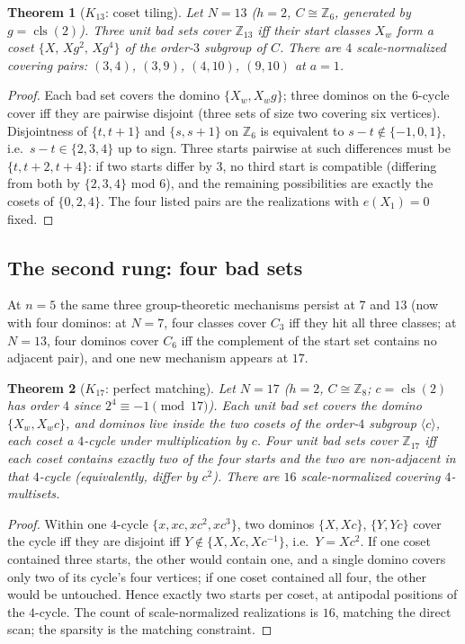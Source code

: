 \documentclass[11pt,a4paper]{article}
\numberwithin{equation}{section}
\theoremstyle{plain}
\theoremstyle{plain}
\newtheorem{theorem}{Theorem}[section]
\theoremstyle{definition}
\theoremstyle{remark}
\newcommand{\Z}{\mathbb{Z}}
\DeclareMathOperator{\cls}{cls}
\begin{document}
\begin{theorem}[$K_{13}$: coset tiling]\label{thm:K13}
Let $N=13$ ($h=2$, $C\cong\Z_6$, generated by $g=\cls(2)$). Three unit
bad sets cover $\Z_{13}$ iff their start classes $X_w$ form a coset
$\{X,\,Xg^2,\,Xg^4\}$ of the order-$3$ subgroup of $C$. There are $4$
scale-normalized covering pairs: $(3,4)$, $(3,9)$, $(4,10)$, $(9,10)$ at
$a=1$.
\end{theorem}

\begin{proof}
Each bad set covers the domino $\{X_w,X_wg\}$; three dominos on the
$6$-cycle cover iff they are pairwise disjoint (three sets of size two
covering six vertices). Disjointness of $\{t,t+1\}$ and $\{s,s+1\}$ on
$\Z_6$ is equivalent to $s-t\notin\{-1,0,1\}$, i.e.\ $s-t\in\{2,3,4\}$
up to sign. Three starts pairwise at such differences must be
$\{t,t+2,t+4\}$: if two starts differ by $3$, no third start is compatible
(differing from both by $\{2,3,4\}$ mod $6$), and the remaining
possibilities are exactly the cosets of $\{0,2,4\}$. The four listed
pairs are the realizations with $e(X_1)=0$ fixed.
\end{proof}

\subsection{The second rung: four bad sets}\label{sec:K5}

At $n=5$ the same three group-theoretic mechanisms persist at
$7$ and $13$ (now with four dominos: at $N=7$, four classes cover
$C_3$ iff they hit all three classes; at $N=13$, four dominos cover
$C_6$ iff the complement of the start set contains no adjacent pair), and
one new mechanism appears at $17$.

\begin{theorem}[$K_{17}$: perfect matching]\label{thm:K17}
Let $N=17$ ($h=2$, $C\cong\Z_8$; $c=\cls(2)$ has order $4$ since
$2^4\equiv-1 \pmod{17}$). Each unit bad set covers the domino
$\{X_w,X_wc\}$, and dominos live inside the two cosets of the order-$4$
subgroup $\langle c\rangle$, each coset a $4$-cycle under multiplication
by $c$. Four unit bad sets cover $\Z_{17}$ iff each coset contains
exactly two of the four starts and the two are non-adjacent in that
$4$-cycle (equivalently, differ by $c^2$). There are $16$
scale-normalized covering $4$-multisets.
\end{theorem}

\begin{proof}
Within one $4$-cycle $\{x,xc,xc^2,xc^3\}$, two dominos
$\{X,Xc\}$, $\{Y,Yc\}$ cover the cycle iff they are disjoint iff
$Y\notin\{X,Xc,Xc^{-1}\}$, i.e.\ $Y=Xc^2$. If one coset contained three
starts, the other would contain one, and a single domino covers only two
of its cycle's four vertices; if one coset contained all four, the other
would be untouched. Hence exactly two starts per coset, at antipodal
positions of the $4$-cycle. The count of scale-normalized realizations is
$16$, matching the direct scan; the sparsity is the matching constraint.
\end{proof}
\end{document}
